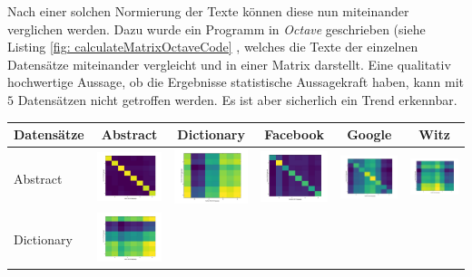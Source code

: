 \documentclass[12pt,german]{article}
\begin{document}


Nach einer solchen Normierung der Texte können diese nun miteinander verglichen werden. Dazu wurde ein Programm in \textit{Octave} geschrieben (siehe Listing \ref{fig: calculateMatrixOctaveCode}  , welches die Texte der einzelnen Datensätze miteinander vergleicht und in einer Matrix darstellt. Eine qualitativ hochwertige Aussage, ob die Ergebnisse statistische Aussagekraft haben, kann mit $5$ Datensätzen nicht getroffen werden. Es ist aber sicherlich ein Trend erkennbar.

\begin{table}[H]
  \centering
  \begin{tabular}{| l | c | c | c | c | c |}
	\hline
	Datensätze & Abstract & Dictionary & Facebook & Google & Witz \\ 
    \hline
    Abstract &
    \includegraphics[width=2.5cm]{../images/abstractData/abstractData.jpg} &
    \includegraphics[width=2.5cm]{../images/abstractData/dictData.jpg} &
    \includegraphics[width=2.5cm]{../images/abstractData/facebookData.jpg} &
    \includegraphics[width=2.5cm]{../images/abstractData/googleData.jpg} &
    \includegraphics[width=2.5cm]{../images/abstractData/witzData.jpg} \\
    \hline
    Dictionary &
    \includegraphics[width=2.5cm]{../images/dictData/abstractData.jpg} &

\end{tabular}
\end{table}
\end{document}
